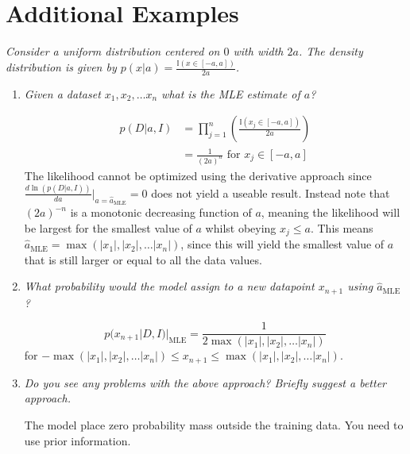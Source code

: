 \chapter{Additional Examples}

\begin{example}
	\emph{Consider a uniform distribution centered on $0$ with width $2a$. The density distribution is given by $p(x|a)=\frac{\mathbb{I}(x\in[-a,a])}{2a}$.}
	
	\begin{enumerate}
		\item \emph{Given a dataset $x_1,x_2,\dots x_n$ what is the MLE estimate of $a$?}
		
		\begin{equation}
			\begin{split}
				p(D|a,I)&=\prod_{j=1}^n(\frac{\mathbb{I}(x_j\in[-a,a])}{2a})\\
				&=\frac{1}{(2a)^n} \text{ for $x_j\in [-a,a]$}
			\end{split}
		\end{equation}
		The likelihood cannot be optimized using the derivative approach since $\frac{d\ln(p(D|a,I))}{da}\big|_{a=\hat{a}_{\text{MLE}}}=0$ does not yield a useable result. Instead note that $(2a)^{-n}$ is a monotonic decreasing function of $a$, meaning the likelihood will be largest for the smallest value of $a$ whilst obeying $x_j\leq a$. This means $\hat{a}_{\text{MLE}}=\max(|x_1|,|x_2|,\dots |x_n|)$, since this will yield the smallest value of $a$ that is still larger or equal to all the data values.
		
		\item \emph{What probability would the model assign to a new datapoint $x_{n+1}$ using $\hat{a}_{\text{MLE}}$?}
		
		\begin{equation}
			p(x_{n+1}|D,I)|_{\text{MLE}} =\frac{1}{2\max(|x_1|,|x_2|,\dots |x_n|)}
		\end{equation}
		for $-\max(|x_1|,|x_2|,\dots |x_n|) \leq x_{n+1}\leq \max(|x_1|,|x_2|,\dots |x_n|)$.
		
		\item \emph{Do you see any problems with the above approach? Briefly suggest a better approach.}\newline
		
		The model place zero probability mass outside the training data. You need to use prior information.
	\end{enumerate}
\end{example}





